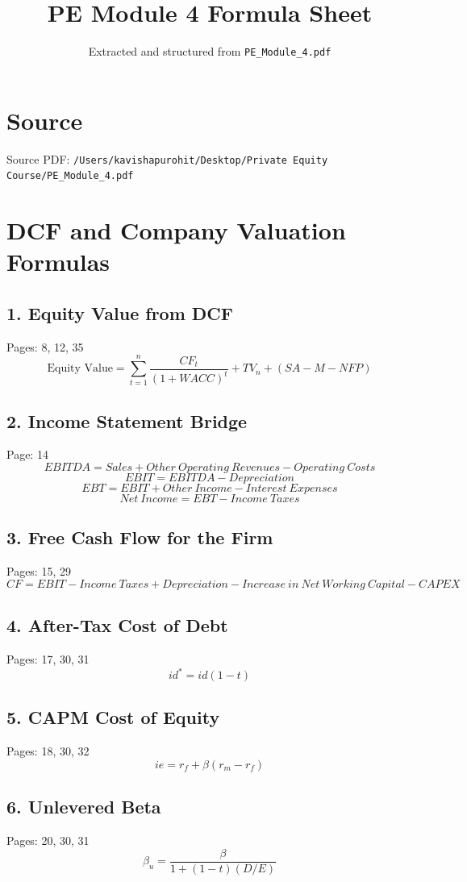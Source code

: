 \documentclass[11pt]{article}
\title{PE Module 4 Formula Sheet}
\author{Extracted and structured from \texttt{PE\_Module\_4.pdf}}
\date{}
\begin{document}
\maketitle

\section*{Source}
Source PDF: \texttt{/Users/kavishapurohit/Desktop/Private Equity Course/PE\_Module\_4.pdf}

\section*{DCF and Company Valuation Formulas}

\subsection*{1. Equity Value from DCF}
Pages: 8, 12, 35
\[
\text{Equity Value} = \sum_{t=1}^{n} \frac{CF_t}{(1 + WACC)^t} + TV_n + (SA - M - NFP)
\]

\subsection*{2. Income Statement Bridge}
Page: 14
\[
EBITDA = Sales + Other\ Operating\ Revenues - Operating\ Costs
\]
\[
EBIT = EBITDA - Depreciation
\]
\[
EBT = EBIT + Other\ Income - Interest\ Expenses
\]
\[
Net\ Income = EBT - Income\ Taxes
\]

\subsection*{3. Free Cash Flow for the Firm}
Pages: 15, 29
\[
CF = EBIT - Income\ Taxes + Depreciation - Increase\ in\ Net\ Working\ Capital - CAPEX
\]

\subsection*{4. After-Tax Cost of Debt}
Pages: 17, 30, 31
\[
id^* = id (1 - t)
\]

\subsection*{5. CAPM Cost of Equity}
Pages: 18, 30, 32
\[
ie = r_f + \beta (r_m - r_f)
\]

\subsection*{6. Unlevered Beta}
Pages: 20, 30, 31
\[
\beta_u = \frac{\beta}{1 + (1 - t)(D/E)}
\]
\end{document}
